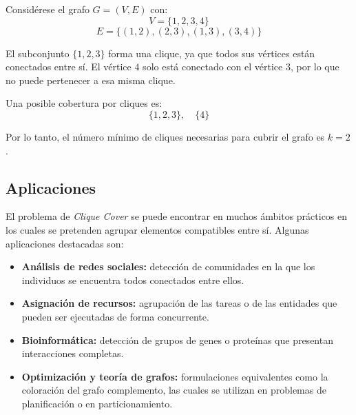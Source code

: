 Considérese el grafo $G = (V, E)$ con:
\[
V = \{1,2,3,4\}
\]
\[
E = \{(1,2), (2,3), (1,3), (3,4)\}
\]

El subconjunto $\{1,2,3\}$ forma una clique, ya que todos sus vértices están conectados entre sí. El vértice $4$ solo está conectado con el vértice $3$, por lo que no puede pertenecer a esa misma clique.

Una posible cobertura por cliques es:
\[
\{1,2,3\}, \quad \{4\}
\]

    Por lo tanto, el número mínimo de cliques necesarias para cubrir el grafo es $k = 2$.

\subsection{Aplicaciones}    
El problema de \textit{Clique Cover} se puede encontrar en muchos ámbitos prácticos en los cuales se pretenden agrupar elementos compatibles entre sí. Algunas aplicaciones destacadas son: 

\begin{itemize}
    \item \textbf{Análisis de redes sociales:} detección de comunidades en la que los individuos se encuentra todos conectados entre ellos.
    
    \item \textbf{Asignación de recursos:} agrupación de las tareas o de las entidades que pueden ser ejecutadas de forma concurrente.
    
    \item \textbf{Bioinformática:} detección de grupos de genes o proteínas que presentan interacciones completas.
    
    \item \textbf{Optimización y teoría de grafos:} formulaciones equivalentes como la coloración del grafo complemento, las cuales se utilizan en problemas de planificación o en particionamiento.
\end{itemize}